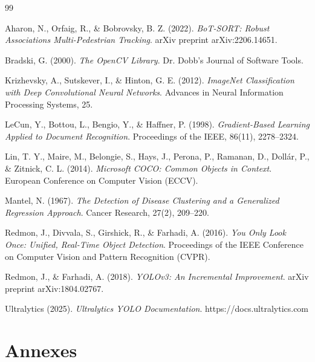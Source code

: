 \documentclass[11pt,a4paper]{report}
\begin{document}
\begin{thebibliography}{99}

Aharon, N., Orfaig, R., \& Bobrovsky, B. Z. (2022).
\newblock \textit{BoT-SORT: Robust Associations Multi-Pedestrian Tracking}.
\newblock arXiv preprint arXiv:2206.14651.

Bradski, G. (2000).
\newblock \textit{The OpenCV Library}.
\newblock Dr. Dobb's Journal of Software Tools.

Krizhevsky, A., Sutskever, I., \& Hinton, G. E. (2012).
\newblock \textit{ImageNet Classification with Deep Convolutional Neural Networks}.
\newblock Advances in Neural Information Processing Systems, 25.

LeCun, Y., Bottou, L., Bengio, Y., \& Haffner, P. (1998).
\newblock \textit{Gradient-Based Learning Applied to Document Recognition}.
\newblock Proceedings of the IEEE, 86(11), 2278--2324.

Lin, T. Y., Maire, M., Belongie, S., Hays, J., Perona, P.,
Ramanan, D., Dollár, P., \& Zitnick, C. L. (2014).
\newblock \textit{Microsoft COCO: Common Objects in Context}.
\newblock European Conference on Computer Vision (ECCV).

Mantel, N. (1967).
\newblock \textit{The Detection of Disease Clustering and a Generalized Regression Approach}.
\newblock Cancer Research, 27(2), 209--220.

Redmon, J., Divvala, S., Girshick, R., \& Farhadi, A. (2016).
\newblock \textit{You Only Look Once: Unified, Real-Time Object Detection}.
\newblock Proceedings of the IEEE Conference on Computer Vision and Pattern Recognition (CVPR).

Redmon, J., \& Farhadi, A. (2018).
\newblock \textit{YOLOv3: An Incremental Improvement}.
\newblock arXiv preprint arXiv:1804.02767.

Ultralytics (2025).
\newblock \textit{Ultralytics YOLO Documentation}.
\newblock https://docs.ultralytics.com

\end{thebibliography}


\appendix

\chapter*{Annexes}
\end{document}
